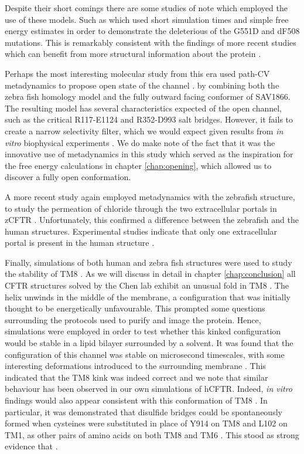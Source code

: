 Despite their short comings there are some studies of note which employed the use of these models. Such as \cite{belmonte2015} which used short simulation times and simple free energy estimates in order to demonstrate the deleterious of the G551D and dF508 mutations. This is remarkably consistent with the findings of more recent studies which can benefit from more structural information about the protein \cite{bahia2021}. 

Perhaps the most interesting molecular study from this era used path-CV metadynamics to propose open state of the channel \cite{Hoffmann2018}. by combining both the zebra fish homology model and the fully outward facing conformer of SAV1866. The resulting model has several characteristics expected of the open channel, such as the critical R117-E1124 and R352-D993 salt bridges. However, it fails to create a narrow selectivity filter, which we would expect given results from \textit{in vitro} biophysical experiments \cite{linsdell2016, linsdell2017, linsdell2021, li2018b, linsdell2020, negoda2019}. We do make note of the fact that it was the innovative use of metadynamics in this study which served as the inspiration for the free energy calculations in chapter \ref{chap:opening}, which allowed us to discover a fully open conformation. 

A more recent study again employed metadynamics with the zebrafish structure, to study the permeation of chloride through the two extracellular portals in zCFTR \cite{farkas2020}. Unfortunately, this confirmed a difference between the zebrafish and the human structures. Experimental studies indicate that only one extracellular portal is present in the human structure \cite{linsdell2018}.

Finally, simulations of both human and zebra fish structures were used to study the stability of TM8 \cite{corradi2018}. As we will discuss in detail in chapter \ref{chap:conclusion} all CFTR structures solved by the Chen lab exhibit an unusual fold in TM8 \cite{fiedorczuk2021, liu2017, liu2019, zhang2016, zhang2018a, zhang2017a}. The helix unwinds in the middle of the membrane, a configuration that was initially thought to be energetically unfavourable. This prompted some questions surrounding the protocols used to purify and image the protein. Hence, simulations were employed in order to test whether this kinked configuration would be stable in a lipid bilayer surrounded by a solvent. It was found that the configuration of this channel was stable on microsecond timescales, with some interesting deformations introduced to the surrounding membrane \cite{corradi2018}. This indicated that the TM8 kink was indeed correct and we note that similar behaviour has been observed in our own simulations of hCFTR. Indeed, \textit{in vitro} findings would also appear consistent with this conformation of TM8 \cite{infield2021}. In particular, it was demonstrated that disulfide bridges could be  spontaneously formed when cysteines were substituted in place of Y914 on TM8 and L102 on TM1, as other pairs of amino acids on both TM8 and TM6 \cite{negoda2019}. This stood as strong evidence that .

